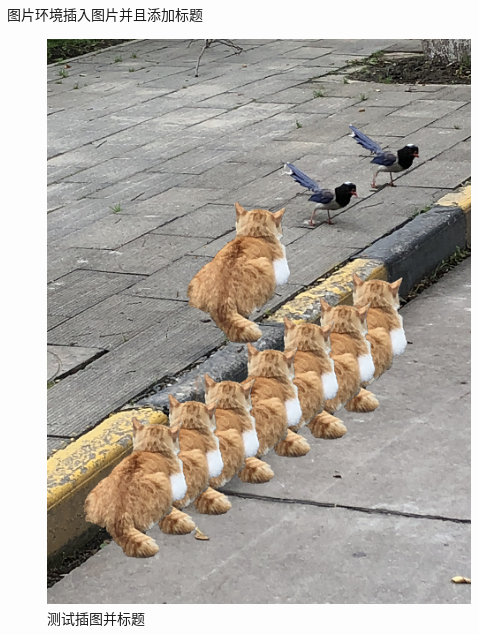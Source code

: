 \documentclass[no-math, compress]{beamer}
\begin{document}
\begin{frame}{图片环境}{插入图片并且添加标题}
    \begin{figure}
        \centering
        \includegraphics[height=0.6\textheight]{image01}
        \caption{测试插图并标题}
    \end{figure}
\end{frame}
\end{document}
